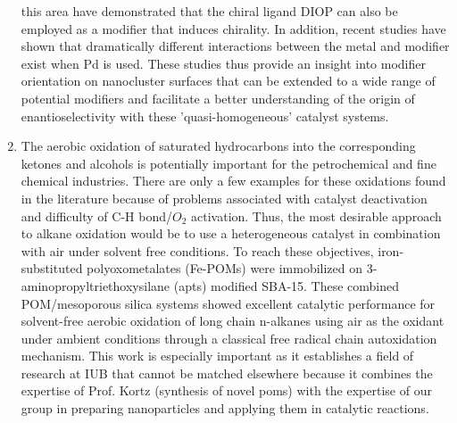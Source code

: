 \begin{enumerate}
this area have demonstrated that the chiral ligand DIOP can also
be employed as a modifier that induces chirality. In addition,
recent studies have shown that dramatically different interactions
between the metal and modifier exist when Pd is used. These
studies thus provide an insight into modifier orientation on
nanocluster surfaces that can be extended to a wide range of
potential modifiers and facilitate a better understanding of the
origin of enantioselectivity with these 'quasi-homogeneous'
catalyst systems. \item The aerobic oxidation of saturated
hydrocarbons into the corresponding ketones and alcohols is
potentially important for the petrochemical and fine chemical
industries. There are only a few examples for these oxidations
found in the literature because of problems associated with
catalyst deactivation and difficulty of C-H bond/$O_2$ activation.
Thus, the most desirable approach to alkane oxidation would be to
use a heterogeneous catalyst in combination with air under solvent
free conditions. To reach these objectives, iron-substituted
polyoxometalates (Fe-POMs) were immobilized on
3-aminopropyltriethoxysilane (apts) modified SBA-15. These
combined POM/mesoporous silica systems showed excellent catalytic
performance for solvent-free aerobic oxidation of long chain
n-alkanes using air as the oxidant under ambient conditions
through a classical free radical chain autoxidation mechanism.
This work is especially important as it establishes a field of
research at IUB that cannot be matched elsewhere because it
combines the expertise of Prof. Kortz (synthesis of novel poms)
with the expertise of our group in preparing nanoparticles and
applying them in catalytic reactions.
\end{enumerate}


